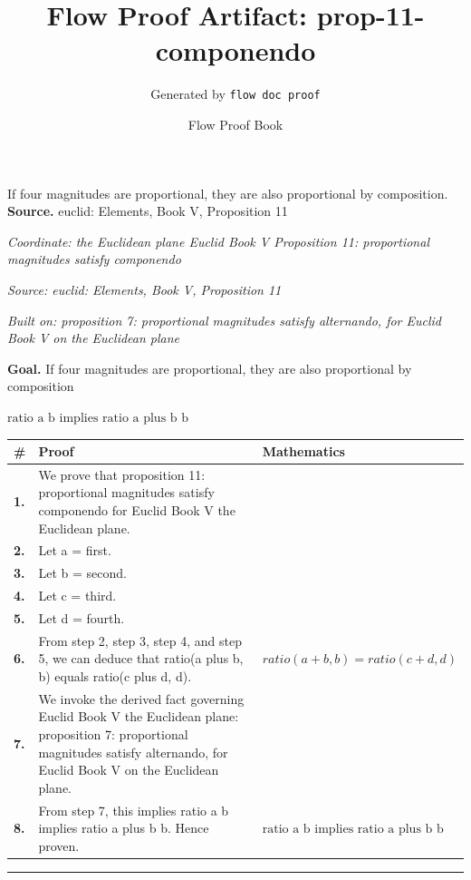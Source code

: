 \documentclass[11pt]{article}
\title{Flow Proof Artifact: prop-11-componendo}
\author{Generated by \texttt{flow doc proof}}
\date{Flow Proof Book}
\theoremstyle{definition}
\begin{document}
\maketitle
If four magnitudes are proportional, they are also proportional by composition.\\[0.5em]
\textbf{Source.} euclid: Elements, Book V, Proposition 11\\[0.5em]
\bigskip
{}\par
\smallskip\noindent\textit{Coordinate: the Euclidean plane \cdot Euclid Book V \cdot Proposition 11: proportional magnitudes satisfy componendo}\par
\smallskip\noindent\textit{Source: euclid: Elements, Book V, Proposition 11}\par
\smallskip\noindent\textit{Built on: proposition 7: proportional magnitudes satisfy alternando, for Euclid Book V on the Euclidean plane}\par
\medskip
\noindent\textbf{Goal.} If four magnitudes are proportional, they are also proportional by composition\par
\noindent$\displaystyle \text{ratio a b implies ratio a plus b b}$\par
\medskip
\noindent
\begin{tabular}{@{} >{\raggedright\arraybackslash}p{} >{\raggedright\arraybackslash}p{} >{\raggedleft\arraybackslash}p{} @{}}
\textbf{\#} & \textbf{Proof} & \textbf{Mathematics} \\
\midrule
\textbf{1.} & We prove that proposition 11: proportional magnitudes satisfy componendo for Euclid Book V the Euclidean plane. & \\[0.45em]
\textbf{2.} & Let a = first. & \\[0.45em]
\textbf{3.} & Let b = second. & \\[0.45em]
\textbf{4.} & Let c = third. & \\[0.45em]
\textbf{5.} & Let d = fourth. & \\[0.45em]
\textbf{6.} & From step 2, step 3, step 4, and step 5, we can deduce that ratio(a plus b, b) equals ratio(c plus d, d). & $\displaystyle ratio(a + b, b) = ratio(c + d, d)$ \\[0.45em]
\textbf{7.} & We invoke the derived fact governing Euclid Book V the Euclidean plane: proposition 7: proportional magnitudes satisfy alternando, for Euclid Book V on the Euclidean plane. & \\[0.45em]
\textbf{8.} & From step 7, this implies ratio a b implies ratio a plus b b. Hence proven. & $\displaystyle \text{ratio a b implies ratio a plus b b}$ \\[0.45em]
\bottomrule
\end{tabular}
\label{thm:Geometry-Euclid Book V-proposition_11_proportional_magnitudes_satisfy_componendo}
\par\medskip\hrule
\end{document}
